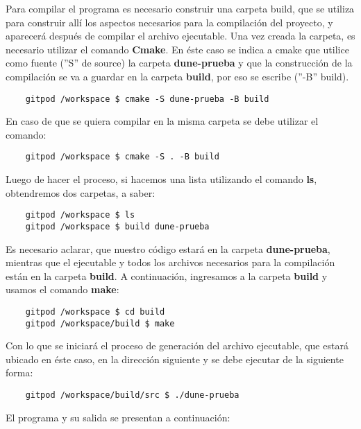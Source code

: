 Para compilar el programa es necesario construir una carpeta build, que se utiliza  para construir allí 
los aspectos necesarios para la compilación del proyecto, y aparecerá después 
de compilar el archivo ejecutable.  Una vez creada la carpeta, es necesario utilizar el comando \textbf{Cmake}.  En éste caso se 
indica a cmake que utilice como fuente (''S'' de source) la carpeta \textbf{dune-prueba} y que la construcción de la 
compilación se va a guardar en la carpeta \textbf{build}, por eso se escribe (''-B'' build). 
\begin{verbatim}
	gitpod /workspace $ cmake -S dune-prueba -B build
\end{verbatim}
En caso de que se quiera compilar en la misma carpeta se debe utilizar el comando: 
\begin{verbatim}
	gitpod /workspace $ cmake -S . -B build
\end{verbatim}
Luego de hacer el proceso, si hacemos una lista utilizando el comando \textbf{ls}, obtendremos dos carpetas, a saber:
\begin{verbatim}
	gitpod /workspace $ ls
	gitpod /workspace $ build dune-prueba
\end{verbatim}
Es necesario aclarar, que nuestro código estará en la carpeta \textbf{dune-prueba}, mientras que el ejecutable y 
todos los archivos necesarios para la compilación están en la carpeta \textbf{build}.  A continuación, ingresamos 
a la carpeta \textbf{build} y usamos el comando \textbf{make}:
\begin{verbatim}
	gitpod /workspace $ cd build
	gitpod /workspace/build $ make
\end{verbatim}
Con lo que se iniciará el proceso de generación del archivo ejecutable, que estará ubicado en éste caso, en 
la dirección siguiente y se debe ejecutar de la siguiente forma:
\begin{verbatim}
	gitpod /workspace/build/src $ ./dune-prueba
\end{verbatim}

El programa y su salida se presentan a continuación:
\begin{listing}[ht!]
	\inputminted{bash}{dune-learn-1.txt}
\end{listing}